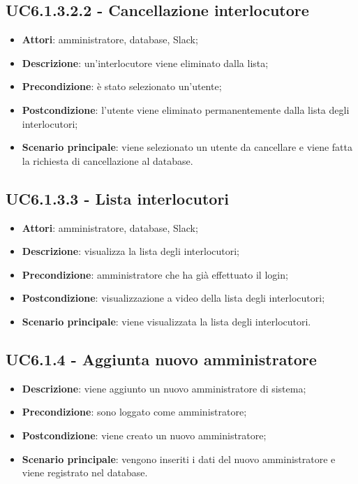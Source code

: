 \documentclass[../AnalisiDeiRequisiti.tex]{subfiles}
\begin{document}
\subsection{UC6.1.3.2.2 - Cancellazione interlocutore} 
\label{sssec:UC6.1.3.2.2} 
\begin{itemize} 
\item \textbf{Attori}: amministratore, database, Slack;
\item \textbf{Descrizione}: un'interlocutore viene eliminato dalla lista;
\item \textbf{Precondizione}: è stato selezionato un'utente;
\item \textbf{Postcondizione}: l'utente viene eliminato permanentemente dalla lista degli interlocutori;
\item \textbf{Scenario principale}: viene selezionato un utente da cancellare e viene fatta la richiesta di cancellazione al database.\end{itemize} 
\subsection{UC6.1.3.3 - Lista interlocutori} 
\label{sssec:UC6.1.3.3} 
\begin{itemize} 
\item \textbf{Attori}: amministratore, database, Slack;
\item \textbf{Descrizione}: visualizza la lista degli interlocutori;
\item \textbf{Precondizione}: amministratore che ha già effettuato il login;
\item \textbf{Postcondizione}: visualizzazione a video della lista degli interlocutori;
\item \textbf{Scenario principale}: viene visualizzata la lista degli interlocutori.\end{itemize} 
\subsection{UC6.1.4 - Aggiunta nuovo amministratore} 
\label{sssec:UC6.1.4} 
\begin{itemize} 
\item \textbf{Descrizione}: viene aggiunto un nuovo amministratore di sistema;
\item \textbf{Precondizione}: sono loggato come amministratore;
\item \textbf{Postcondizione}: viene creato un nuovo amministratore;
\item \textbf{Scenario principale}: vengono inseriti i dati del nuovo amministratore e viene registrato nel database.\end{itemize} 
\end{document}
